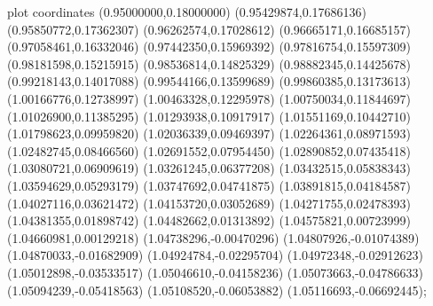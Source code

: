  plot coordinates {(0.95000000,0.18000000) (0.95429874,0.17686136) (0.95850772,0.17362307) (0.96262574,0.17028612) (0.96665171,0.16685157) (0.97058461,0.16332046) (0.97442350,0.15969392) (0.97816754,0.15597309) (0.98181598,0.15215915) (0.98536814,0.14825329) (0.98882345,0.14425678) (0.99218143,0.14017088) (0.99544166,0.13599689) (0.99860385,0.13173613) (1.00166776,0.12738997) (1.00463328,0.12295978) (1.00750034,0.11844697) (1.01026900,0.11385295) (1.01293938,0.10917917) (1.01551169,0.10442710) (1.01798623,0.09959820) (1.02036339,0.09469397) (1.02264361,0.08971593) (1.02482745,0.08466560) (1.02691552,0.07954450) (1.02890852,0.07435418) (1.03080721,0.06909619) (1.03261245,0.06377208) (1.03432515,0.05838343) (1.03594629,0.05293179) (1.03747692,0.04741875) (1.03891815,0.04184587) (1.04027116,0.03621472) (1.04153720,0.03052689) (1.04271755,0.02478393) (1.04381355,0.01898742) (1.04482662,0.01313892) (1.04575821,0.00723999) (1.04660981,0.00129218) (1.04738296,-0.00470296) (1.04807926,-0.01074389) (1.04870033,-0.01682909) (1.04924784,-0.02295704) (1.04972348,-0.02912623) (1.05012898,-0.03533517) (1.05046610,-0.04158236) (1.05073663,-0.04786633) (1.05094239,-0.05418563) (1.05108520,-0.06053882) (1.05116693,-0.06692445)};
